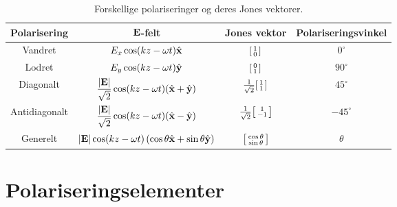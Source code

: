 \renewcommand{\arraystretch}{2.8}
\setlength{\tabcolsep}{9pt}
\begin{table}[h!]
	\centering
	\begin{tabular}{c | c | c | c |}
		Polarisering &$\mathbf{E}$-felt & Jones vektor & Polariseringsvinkel\\\hline
		Vandret & $E_x\cos(kz-\omega t)\hat{\mathbf{x}}$ & $\begin{bsmallmatrix} 1 \\ 0 \\ \end{bsmallmatrix}$&$0^\circ$\\
		Lodret & $E_y\cos(kz-\omega t)\hat{\mathbf{y}}$ & $\begin{bsmallmatrix} 0 \\ 1 \\ \end{bsmallmatrix}$&$90^\circ$\\
		Diagonalt & $\dfrac{\left| \mathbf{E} \right|}{\sqrt{2}}\cos(kz-\omega t)(\hat{\mathbf{x}}+\hat{\mathbf{y}})$ & $\frac{1}{\sqrt{2}} \begin{bsmallmatrix} 1 \\ 1 \\ \end{bsmallmatrix}$&$45^\circ$\\
		Antidiagonalt & $\dfrac{\left| \mathbf{E} \right|}{\sqrt{2}}\cos(kz-\omega t)(\hat{\mathbf{x}}-\hat{\mathbf{y}})$ & $\frac{1}{\sqrt{2}} \begin{bsmallmatrix} 1 \\ -1 \\ \end{bsmallmatrix}$&$-45^\circ$\\
		Generelt & $\left| \mathbf{E} \right|\cos(kz-\omega t)\left( \cos \theta \hat{\mathbf{x}}+\sin \theta\hat{\mathbf{y}} \right)$ & $\begin{bsmallmatrix} \cos \theta \\ \sin \theta\\ \end{bsmallmatrix}$  & $\theta$\\
	\end{tabular}
	\caption{Forskellige polariseringer og deres Jones vektorer.}
	\label{jones_tabel}
\end{table}

\renewcommand{\arraystretch}{1}
\setlength{\tabcolsep}{6pt}

\section{Polariseringselementer}

